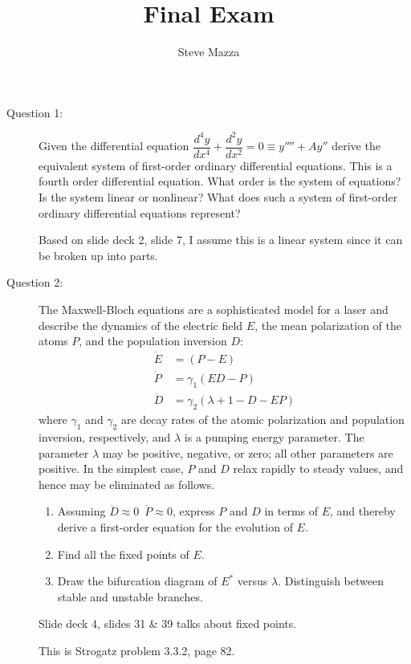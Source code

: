 \documentclass[letterpaper,10pt]{article}
\title{Final Exam}
\author{Steve Mazza}
\begin{document}
\maketitle

\begin{description}
\item[Question 1:]
Given the differential equation $\dfrac{d^4y}{dx^4}+\dfrac{d^2y}{dx^2}=0\equiv y''''+Ay''$ derive the equivalent system of first-order ordinary differential equations.  This is a fourth order differential equation.  What order is the system of equations?  Is the system linear or nonlinear?  What does such a system of first-order ordinary differential equations represent?

Based on slide deck 2, slide 7, I assume this is a linear system since it can be broken up into parts.

\item[Question 2:]
The Maxwell-Bloch equations are a sophisticated model for a laser and describe the dynamics of the electric field $E$, the mean polarization of the atoms $P$, and the population inversion $D$:
\begin{align*}
\dot{E} &= (P-E) \\
\dot{P} &= \gamma_1(ED-P) \\
\dot{D} &= \gamma_2(\lambda+1-D-EP)
\end{align*}
where $\gamma_1$ and $\gamma_2$ are decay rates of the atomic polarization and population inversion, respectively, and $\lambda$ is a pumping energy parameter.  The parameter $\lambda$ may be positive, negative, or zero; all other parameters are positive.  In the simplest case, $P$ and $D$ relax rapidly to steady values, and hence may be eliminated as follows.
\begin{enumerate}
\item Assuming $\dot{D}\approx 0$\ $\dot{P}\approx 0$, express $P$ and $D$ in terms of $E$, and thereby derive a first-order equation for the evolution of $E$.
\item Find all the fixed points of $E$.
\item Draw the bifurcation diagram of $E^*$ versus $\lambda$.  Distinguish between stable and unstable branches.
\end{enumerate}

Slide deck 4, slides 31 \& 39 talks about fixed points.

This is Strogatz problem 3.3.2, page 82.


\end{description}
\end{document}
